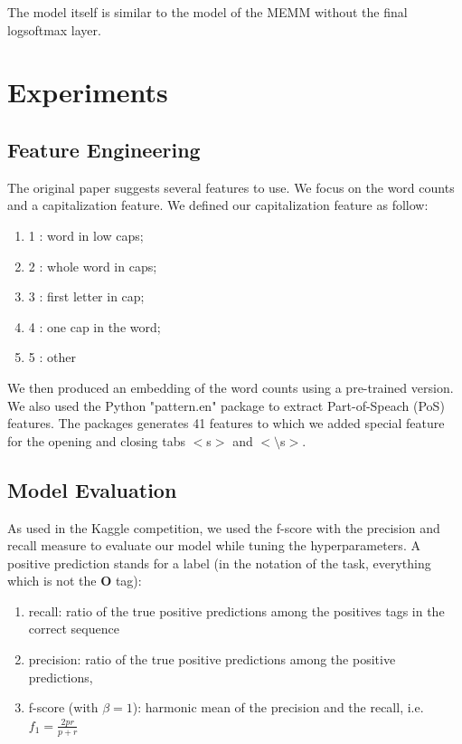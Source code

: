 \documentclass[11pt]{article}
\begin{document}
The model itself is similar to the model of the MEMM without the final logsoftmax layer.
\section{Experiments}

\subsection{Feature Engineering}

The original paper suggests several features to use. We focus on the word counts and a capitalization feature. We defined our capitalization feature as follow:
\begin{enumerate}
	\item 1 : word in low caps;
	\item 2 : whole word in caps;
	\item 3 : first letter in cap;
	\item 4 : one cap in the word;
	\item 5 : other
\end{enumerate}

We then produced an embedding of the word counts using a pre-trained version.\\

We also used the Python "pattern.en" package to extract Part-of-Speach (PoS) features. The packages generates 41 features to which we added special feature for the opening and closing tabs $<$s$>$ and $<\setminus$s$>$.


\subsection{Model Evaluation}

As used in the Kaggle competition, we used the f-score with the precision and recall measure to evaluate our model while tuning the hyperparameters. A positive prediction stands for a label (in the notation of the task, everything which is not the \textbf{O} tag):

\begin{enumerate}
	\item recall: ratio of the true positive predictions among the positives tags in the correct sequence
	\item precision: ratio of the true positive predictions among the positive predictions,
	\item f-score (with $\beta = 1$): harmonic mean of the precision and the recall, i.e. $f_{1} = \frac{2pr}{p+r}$
\end{enumerate}
\end{document}
